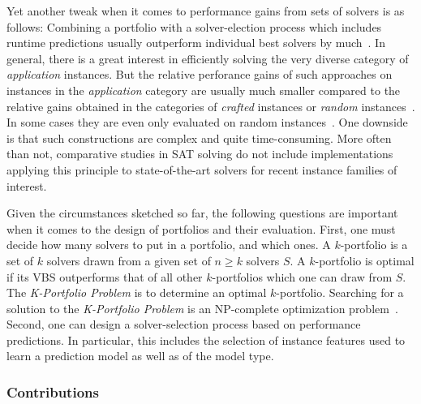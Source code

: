 \documentclass[conference]{IEEEtran}
\begin{document}
Yet another tweak when it comes to performance gains from sets of solvers is as follows:
Combining a portfolio with a solver-election process which includes runtime predictions usually outperform individual best solvers by much~\cite{xu2008satzilla}. 
In general, there is a great interest in efficiently solving the very diverse category of \emph{application} instances. 
But the relative perforance gains of such approaches on instances in the \emph{application} category are usually much smaller compared to the relative gains obtained in the categories of \emph{crafted} instances or \emph{random} instances~\cite{Xu:2012:EvalContribVBS,Collautti:2013:SNNAP}.
In some cases they are even only evaluated on random instances~\cite{Kadioglu:2010:ISAC}.
One downside is that such constructions are complex and quite time-consuming. 
More often than not, comparative studies in SAT solving do not include implementations applying this principle to state-of-the-art solvers for recent instance families of interest.


Given the circumstances sketched so far, the following questions are important when it comes to the design of portfolios and their evaluation. 
First, one must decide how many solvers to put in a portfolio, and which ones. 
A $k$-portfolio is a set of $k$ solvers drawn from a given set of $n \geq k$ solvers $S$. 
A $k$-portfolio is optimal if its VBS outperforms that of all other $k$-portfolios which one can draw from $S$. 
The \emph{K-Portfolio Problem} is to determine an optimal $k$-portfolio. 
Searching for a solution to the \emph{K-Portfolio Problem} is an NP-complete optimization problem~\cite{nof2020real}. 
Second, one can design a solver-selection process based on performance predictions. 
In particular, this includes the selection of instance features used to learn a prediction model as well as of the model type. 

\subsubsection{Contributions}
\end{document}
